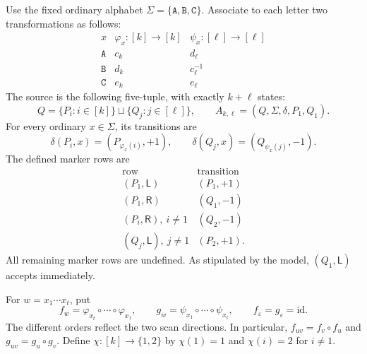 \documentclass[11pt,a4paper]{article}
\theoremstyle{definition}
\theoremstyle{remark}
\newcommand{\LL}{\mathsf L}
\newcommand{\RR}{\mathsf R}
\begin{document}
Use the fixed ordinary alphabet $\Sigma=\{\mathtt A,\mathtt B,\mathtt C\}$.
Associate to each letter two transformations as follows:
\[
\begin{array}{c|cc}
 x&\varphi_x:[k]\to[k]&\psi_x:[\ell]\to[\ell]\\ \hline
 \mathtt A&c_k&d_\ell\\
 \mathtt B&d_k&c_\ell^{-1}\\
 \mathtt C&e_k&e_\ell
\end{array}
\]
The source is the following five-tuple, with exactly $k+\ell$ states:
\begin{equation}\label{eq:source-tuple}
Q=\{P_i:i\in[k]\}\sqcup\{Q_j:j\in[\ell]\},
 \qquad A_{k,\ell}=(Q,\Sigma,\delta,P_1,Q_1).
\end{equation}
For every ordinary $x\in\Sigma$, its transitions are
\begin{equation}\label{eq:source-ordinary}
\delta(P_i,x)=(P_{\varphi_x(i)},+1),\qquad
 \delta(Q_j,x)=(Q_{\psi_x(j)},-1).
\end{equation}
The defined marker rows are
\begin{equation}\label{eq:source-markers}
\begin{array}{c|c}
 \text{row}&\text{transition}\\ \hline
 (P_1,\LL)&(P_1,+1)\\
 (P_1,\RR)&(Q_1,-1)\\
 (P_i,\RR),\ i\ne1&(Q_2,-1)\\
 (Q_j,\LL),\ j\ne1&(P_2,+1).
\end{array}
\end{equation}
All remaining marker rows are undefined. As stipulated by the model,
$(Q_1,\LL)$ accepts immediately.

For $w=x_1\cdots x_t$, put
\begin{equation}\label{eq:word-maps}
f_w=\varphi_{x_t}\circ\cdots\circ \varphi_{x_1},\qquad
 g_w=\psi_{x_1}\circ\cdots\circ \psi_{x_t},
 \qquad f_\varepsilon=g_\varepsilon=\mathrm{id}.
\end{equation}
The different orders reflect the two scan directions. In particular,
$f_{uv}=f_v\circ f_u$ and $g_{uv}=g_u\circ g_v$.
Define $\chi:[k]\to\{1,2\}$ by $\chi(1)=1$ and $\chi(i)=2$ for $i\ne1$.
\end{document}
